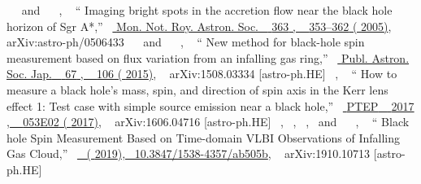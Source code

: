 \documentclass[aps,reprint,superscriptaddress,nofootinbib,floatfix,longbibliography,preprintnumbers]{revtex4-1}
\begin{document}
\begin{thebibliography}{139}
  \BibitemOpen
   { { \  } \  and \   { \  }, \  } {\enquote { {{Imaging bright spots in the accretion flow near the black hole horizon of Sgr A*}},} \  }\href {\doibase 10.1111/j.1365-2966.2005.09458.x} { { {Mon. Not. Roy. Astron. Soc.} \  }  {363} , \   {353--362} ( {2005})}, \   {arXiv:astro-ph/0506433} 
  \BibitemOpen
   { { \  } \  and \   { \  }, \  } {\enquote { {{New method for black-hole spin measurement based on flux variation from an infalling gas ring}},} \  }\href {\doibase 10.1093/pasj/psv074} { { {Publ. Astron. Soc. Jap.} \  }  {67} , \   {106} ( {2015})}, \   {arXiv:1508.03334 [astro-ph.HE]} 
  \BibitemOpen
   { { \  }, \  } {\enquote { {{How to measure a black hole\textquoteright{}s mass, spin, and direction of spin axis in the Kerr lens effect 1: Test case with simple source emission near a black hole}},} \  }\href {\doibase 10.1093/ptep/ptx060} { { {PTEP} \  }  {2017} , \   {053E02} ( {2017})}, \   {arXiv:1606.04716 [astro-ph.HE]} 
  \BibitemOpen
   { { \  },  { \  },  { \  },  \  and \   { \  }, \  } {\enquote { {{Black hole Spin Measurement Based on Time-domain VLBI Observations of Infalling Gas Cloud}},} \  }\href {\doibase 10.3847/1538-4357/ab505b} { \   ( {2019}), \  10.3847/1538-4357/ab505b}, \   {arXiv:1910.10713 [astro-ph.HE]} 

\end{thebibliography}
\end{document}
